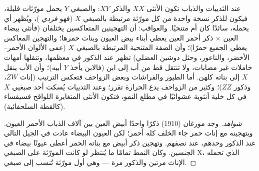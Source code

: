 \begin{proposition}\label{prop:b2:meiosis-heredity:sexlinked}
عند الثدييات والذباب تكون الأنثى $XX$ والذكر $XY$: والصبغي $Y$ يحمل
مورّثات قليلة، فيكون للذكر نسخة واحدة من كل مورّثة مرتبطة بالصبغي $X$
(فهو \emph{فردي })، ويُظهر أي  يحمله، سائدًا كان أم
متنحيًا. والعواقب: أن التهجينين المتعاكسين يختلفان (فأنثى بيضاء
العين $\times$ ذكر أحمر العين يعطي أبناء بيض العيون وبنات حمرها؛
والتهجين المعاكس يعطي الجميع حمرًا)؛ وأن الصفة المتنحية المرتبطة
بالصبغي $X$ (عمى الألوان الأحمر--الأخضر، والناعور، وحثل دوشين العضلي)
تظهر عند الذكور في معظمها، وتنقلها أمهات حاملات غير مصابات، ولا
تنتقل قط من أب إلى ابن (فالابن يأخذ $Y$ أبيه)؛ وأن الأب ينقل $X$
إلى بناته كلهن. أما الطيور والفراشات وبعض الزواحف فتعكس الترتيب
(إناث $ZW$، وذكور $ZZ$)؛ وكثير من الزواحف يدع الحرارة تقرر؛ وعند
الثدييات يُسكت أحد صبغيي $X$ في كل خلية أنثوية عشوائيًا في مطلع
النمو، فتكون الأنثى المتغايرة اللواقح فسيفساء (كالقطة السلحفائية).
\end{proposition}
\begin{proof}[شواهد]
وجد مورغان (1910) ذكرًا واحدًا أبيض العين بين آلاف الذباب الأحمر
العيون. وبتهجينه مع إناث حمر جاء الخلف كله أحمر؛ لكن العيون البيضاء
عادت في الجيل التالي عند الذكور وحدهم، عند نصفهم. وتهجين ذكر أبيض
مع بناته الحمر أعطى عيونًا بيضاء في الجنسين. وكان النمط تمامًا ما
يُنتظر لو كانت المورّثة على الصبغي X، الذي تحمله الإناث مرتين
والذكور مرة --- وهي أول مورّثة تُنسب إلى صبغي.
\end{proof}

